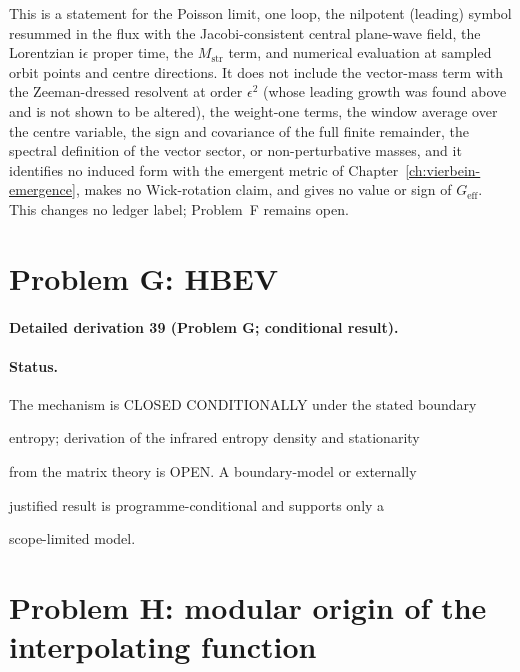 This is a statement for the Poisson limit, one loop, the nilpotent (leading) symbol resummed in the flux with the Jacobi-consistent central plane-wave field, the Lorentzian \(\mathrm i\epsilon\) proper time, the \(M_{\mathrm{str}}\) term, and numerical evaluation at sampled orbit points and centre directions. It does not include the vector-mass term with the Zeeman-dressed resolvent at order \(\epsilon^2\) (whose leading growth was found above and is not shown to be altered), the weight-one terms, the window average over the centre variable, the sign and covariance of the full finite remainder, the spectral definition of the vector sector, or non-perturbative masses, and it identifies no induced form with the emergent metric of Chapter~\ref{ch:vierbein-emergence}, makes no Wick-rotation claim, and gives no value or sign of \(G_{\mathrm{eff}}\). This changes no ledger label; Problem~F remains open.



\section{Problem G: HBEV}

\label{sec:status-G}



\paragraph{Detailed derivation 39 (Problem G; conditional result).} \label{ref:detail-38} %



\paragraph{Status.}

The mechanism is CLOSED CONDITIONALLY under the stated boundary

entropy; derivation of the infrared entropy density and stationarity

from the matrix theory is OPEN. A boundary-model or externally

justified result is programme-conditional and supports only a

scope-limited model.



\section{Problem H: modular origin of the interpolating function}

